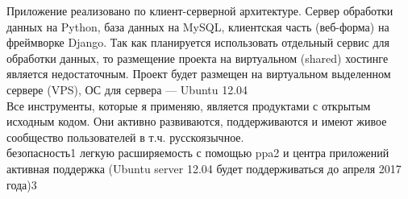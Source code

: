 Приложение реализовано по клиент-серверной архитектуре. Сервер обработки данных на Python, база данных на MySQL, клиентская часть (веб-форма) на фреймворке Django. Так как планируется использовать отдельный сервис для обработки данных, то размещение проекта на виртуальном (shared) хостинге является недостаточным. Проект будет размещен на виртуальном выделенном сервере (VPS), ОС для сервера — Ubuntu 12.04 \\
Все инструменты, которые я применяю, является продуктами с открытым исходным кодом. Они активно развиваются, поддерживаются и имеют живое сообщество пользователей в т.ч. русскоязычное.\\ 


безопасность1
легкую расширяемость с помощью ppa2 и центра приложений
активная поддержка (Ubuntu server 12.04 будет поддерживаться до апреля 2017 года)3

